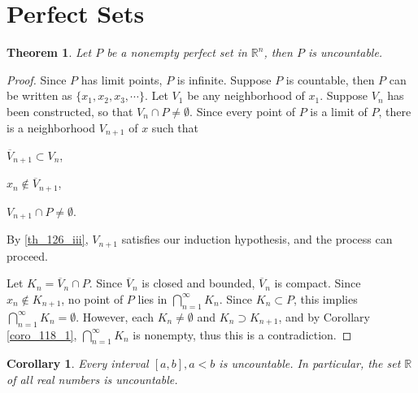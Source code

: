 \documentclass[10pt]{book}
\newtheorem{theorem}{Theorem}[chapter]
\newtheorem{corollary}{Corollary}[theorem]
\theoremstyle{definition}
\numberwithin{equation}{chapter}
\begin{document}
\medskip


\section{Perfect Sets}

\begin{theorem}\label{th_126}
Let $P$ be a nonempty perfect set in $\mathbb{R}^n$, then $P$ is uncountable.
\end{theorem}
\begin{proof}
Since $P$ has limit points, $P$ is infinite. Suppose $P$ is countable, then $P$ can be written as $\{x_1, x_2, x_3, \cdots\}$. Let $V_1$ be any neighborhood of $x_1$. Suppose $V_n$ has been constructed, so that $V_n \cap P \neq \emptyset$. Since every point of $P$ is a limit of $P$, there is a neighborhood $V_{n+1}$ of $x$ such that \begin{enumerate*}[label=(\roman*)]
    \item $\overline{V}_{n+1} \subset V_n$,
    \item $x_n \notin \overline{V}_{n+1}$,
    \item $V_{n+1} \cap P \neq \emptyset$.\label{th_126_iii}
\end{enumerate*}
By \ref{th_126_iii}, $V_{n+1}$ satisfies our induction hypothesis, and the process can proceed. 

Let $K_n = \overline{V}_{n} \cap P$. Since $\overline{V}_{n}$ is closed and bounded, $\overline{V}_{n}$ is compact. Since $x_n \notin K_{n+1}$, no point of $P$ lies in $\bigcap^\infty_{n=1} K_n$. Since $K_n \subset P$, this implies $\bigcap^\infty_{n=1} K_n = \emptyset$. However, each $K_n \neq \emptyset$ and $K_n \supset K_{n+1}$, and by Corollary \ref{coro_118_1}, $\bigcap^\infty_{n=1} K_n$ is nonempty, thus this is a contradiction.
\end{proof}

\medskip

\begin{corollary}
Every interval $[a,b], a < b$ is uncountable. In particular, the set $\mathbb{R}$ of all real numbers is uncountable.
\end{corollary}

\medskip
\end{document}
